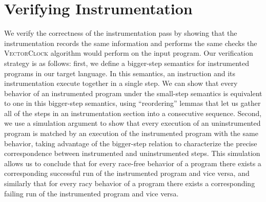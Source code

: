 \documentclass[preprint, 10pt]{sigplanconf}
\newcommand{\VCalg}{\textsc{VectorClock}\xspace}
\begin{document}
\section{Verifying Instrumentation}
\label{verification}
We verify the correctness of the instrumentation pass by showing that the instrumentation records the same information and performs the same checks the \VCalg algorithm would perform on the input program. Our verification strategy is as follows: first, we define a bigger-step semantics for instrumented programs in our target language. In this semantics, an instruction and its instrumentation execute together in a single step. We can show that every behavior of an instrumented program under the small-step semantics is equivalent to one in this bigger-step semantics, using ``reordering'' lemmas that let us gather all of the steps in an instrumentation section into a consecutive sequence. Second, we use a simulation argument to show that every execution of an uninstrumented program is matched by an execution of the instrumented program with the same behavior, taking advantage of the bigger-step relation to characterize the precise correspondence between instrumented and uninstrumented steps. This simulation allows us to conclude that for every race-free behavior of a program there exists a corresponding successful run of the instrumented program and vice versa, and similarly that for every racy behavior of a program there exists a corresponding failing run of the instrumented program and vice versa.
\end{document}
